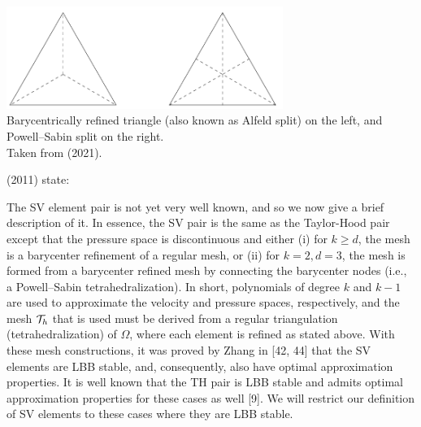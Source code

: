 \begin{center}
\includegraphics[width=9cm]{images/pair_scott_vogelius/scottvogelius_split}\\
{\captionfont 
Barycentrically refined triangle (also known as Alfeld split) on the left,
and Powell–Sabin split on the right.\\ Taken from \textcite{fams21} (2021).}
\end{center}


\textcite{cael11} (2011) state:
\begin{displayquote}
{\color{darkgray}
The SV element pair is not yet very well known,
and so we now give a brief description of it. In essence, the SV pair is the same as
the Taylor-Hood pair except that the pressure space is discontinuous and either
(i) for $k \ge d$, the mesh is a barycenter reﬁnement of a regular mesh, or
(ii) for $k = 2, d = 3$, the mesh is formed from a barycenter reﬁned mesh by
connecting the barycenter nodes (i.e., a Powell–Sabin tetrahedralization).
In short, polynomials of degree $k$ and $k-1$ are used to approximate the velocity
and pressure spaces, respectively, and the mesh ${\cal T}_h$ that is used must be derived from
a regular triangulation (tetrahedralization) of $\Omega$, where each element is reﬁned as
stated above. With these mesh constructions, it was proved by Zhang in [42, 44] that
the SV elements are LBB stable, and, consequently, also have optimal approximation
properties. It is well known that the TH pair is LBB stable and admits optimal
approximation properties for these cases as well [9]. We will restrict our deﬁnition of
SV elements to these cases where they are LBB stable.
}
\end{displayquote}

